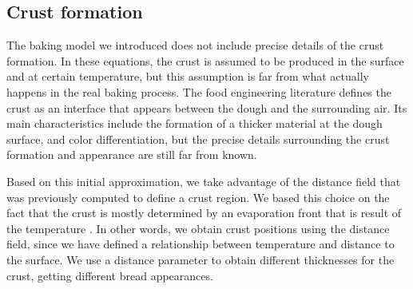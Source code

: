 \subsection{Crust formation}

The baking model we introduced does not include precise details of the crust formation. 
In these equations, the crust is assumed to be produced in the surface and at certain temperature, but this assumption is far from what actually happens in the real baking process. 
The food engineering literature defines the crust as an interface that appears between the dough and the surrounding air.
Its main characteristics include the formation of a thicker material at the dough surface, and color differentiation, but the precise details surrounding the crust formation and appearance are still far from known.

Based on this initial approximation, we take advantage of the distance field that was previously computed to define a crust region.
We based this choice on the fact that the crust is mostly determined by an evaporation front that is result of the temperature \cite{Jefferson2007}. 
In other words, we obtain crust positions using the distance field, since we have defined a relationship between temperature and distance to the surface.
We use a distance parameter to obtain different thicknesses for the crust, getting different bread appearances.


